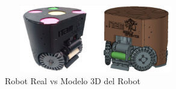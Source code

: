 \documentclass[twocolumn,10pt]{amrob}
\begin{document}
\begin{figure}
  \centering
    \includegraphics[height=3cm,width=8cm]{realVS3D.png}
  \caption{Robot Real vs Modelo 3D del Robot}
  \label{fig:ModRealVSdes}
\end{figure}

\end{document}
